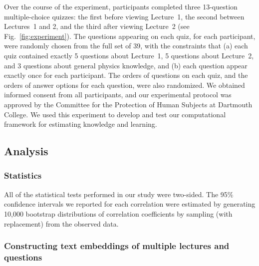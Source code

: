\documentclass[10pt]{article}
\begin{document}
Over the course of the experiment, participants completed three 13-question
multiple-choice quizzes: the first before viewing Lecture~1, the second between
Lectures~1 and 2, and the third after viewing Lecture~2 (see
Fig.~\ref{fig:experiment}). The questions appearing on each quiz, for each
participant, were randomly chosen from the full set of 39, with the constraints
that (a) each quiz contained exactly 5 questions about Lecture~1, 5 questions
about Lecture~2, and 3 questions about general physics knowledge, and (b) each
question appear exactly once for each participant. The orders of questions on
each quiz, and the orders of answer options for each question, were also
randomized. We obtained informed consent from all participants, and our
experimental protocol was approved by the Committee for the Protection of Human
Subjects at Dartmouth College. We used this experiment to develop and test our
computational framework for estimating knowledge and learning.

\subsection*{Analysis}

\subsubsection*{Statistics}

All of the statistical tests performed in our study were two-sided. The 95\%
confidence intervals we reported for each correlation were estimated by
generating 10,000 bootstrap distributions of correlation coefficients by
sampling (with replacement) from the observed data.

\subsubsection*{Constructing text embeddings of multiple lectures and questions}\label{subsec:topic-modeling}
\end{document}
